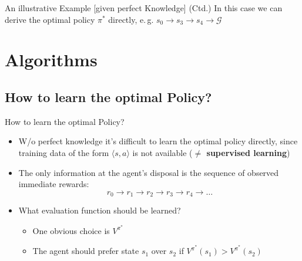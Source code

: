 \begin{frame}{An illustrative Example [given perfect Knowledge] (Ctd.)}{}
	In this case we can derive the optimal policy $\pi^*$ directly,
		e.\,g. $s_0 \rightarrow s_3 \rightarrow s_4 \rightarrow \mathcal{G}$
\end{frame}


\section{Algorithms}

\subsection{How to learn the optimal Policy?}

\begin{frame}{How to learn the optimal Policy?}{}
	\begin{itemize}
		\item W/o perfect knowledge it's difficult to learn the optimal policy directly, since training data of the
			form $\langle s, a \rangle$ is not available (\textbf{$\ne$ supervised learning})
		\item The only information at the agent's disposal is the sequence of observed immediate rewards: 
		\begin{equation*}
			r_0 \longrightarrow r_1 \longrightarrow r_2 \longrightarrow r_3 \longrightarrow r_4 \longrightarrow \dots
		\end{equation*}
		\item What evaluation function should be learned?
		\begin{itemize}
			\item One obvious choice is $V^{\pi^*}$
			\item The agent should prefer state $s_1$ over $s_2$ if $V^{\pi^*}(s_1) > V^{\pi^*}(s_2)$
		\end{itemize}
	\end{itemize}
\end{frame}


